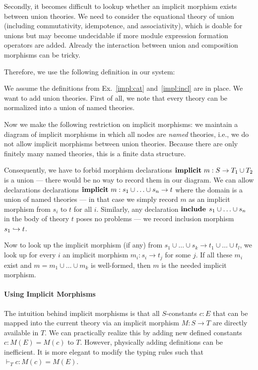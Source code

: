 Secondly, it becomes difficult to lookup whether an implicit morphism exists between union theories.
We need to consider the equational theory of union (including commutativity, idempotence, and associativity), which is doable for unions but may become undecidable if more module expression formation operators are added.
Already the interaction between union and composition morphisms can be tricky.

Therefore, we use the following definition in our system:

\begin{example}\label{impl:union}
We assume the definitions from Ex.~\ref{impl:cat} and~\ref{impl:incl} are in place.
We want to add union theories.
First of all, we note that every theory can be normalized into a union of named theories.

Now we make the following restriction on implicit morphisms: we maintain a diagram of implicit morphisms in which all nodes are \emph{named} theories, i.e., we do not allow implicit morphisms between union theories.
Because there are only finitely many named theories, this is a finite data structure.

Consequently, we have to forbid morphism declarations $\operatorname{\mathbf{implicit}}\,m:S\to T_1\cup T_2$ is a union --- there would be no way to record them in our diagram.
We can allow declarations declarations $\operatorname{\mathbf{implicit}}\,m:s_1\cup\ldots\cup s_n\to t$ where the domain is a union of named theories --- in that case we simply record $m$ as an implicit morphism from $s_i$ to $t$ for all $i$.
Similarly, any declaration $\operatorname{\mathbf{include}}{\;s_1\cup\ldots\cup s_n}$ in the body of theory $t$ poses no problems --- we record inclusion morphism $s_1\hookrightarrow t$.

Now to look up the implicit morphism (if any) from $s_1\cup\ldots\cup s_k\to t_1\cup\ldots\cup t_l$, we look up for every $i$ an implicit morphism $m_i:s_i\to t_j$ for some $j$.
If all these $m_i$ exist and $m=m_1\cup \ldots\cup m_k$ is well-formed, then $m$ is the needed implicit morphism.
\end{example}

\paragraph{Using Implicit Morphisms}
The intuition behind implicit morphisms is that all $S$-constants $c:E$ that can be mapped into the current theory via an implicit morphism $M:S\to T$ are directly available in $T$.
We can practically realize this by adding new defined constants $c:M(E)=M(c)$ to $T$.
However, physically adding definitions can be inefficient.
It is more elegant to modify the typing rules such that $\vdash_T c:M(c)=M(E)$.


